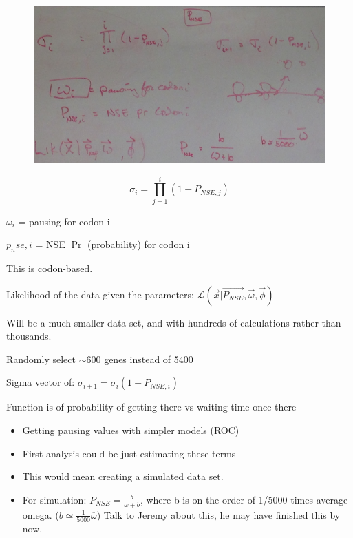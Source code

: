 \documentclass[12pt,hyperref]{labbook}
\begin{document}


\begin{figure}[h!]
    \center
    \includegraphics[width=\textwidth,keepaspectratio]{figures/5-13-16img.jpg}
    \label{PANSE Concept 5-13-16}
\end{figure}

\begin{equation}
    \sigma_{i} = \prod_{j=1}^{i} (1 - P_{NSE,j})
\end{equation}

$\omega_i$ = pausing for codon i

$p_nse, i$  = NSE $\Pr$ (probability) for codon i

This is codon-based.

Likelihood of the data given the parameters: 
$\mathcal{L}(\vec{x}|\vec{P_{NSE}},\vec{\omega}, \vec{\phi})$

Will be a much smaller data set, and with hundreds of calculations rather than thousands.

Randomly select $\sim$600 genes instead of 5400

Sigma vector of: $\sigma_{i + 1} = \sigma_i (1 - P_{NSE, i})$

Function is of probability of getting there vs waiting time once there


\begin{itemize}
    \item Getting pausing values with simpler models (ROC)
    \item First analysis could be just estimating these terms
    \item This would mean creating a simulated data set.
    \item For simulation: $P_{NSE} = \frac{b}{\omega + b}$, where b is on the order of 1/5000 times average omega. ($b \simeq \frac{1}{5000}\overline{\omega}$) Talk to Jeremy about this, he may have finished this by now.
\end{itemize}
\end{document}
